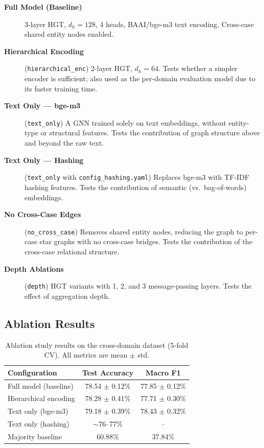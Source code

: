 \documentclass[12pt,a4paper]{report}
\begin{document}
\begin{description}
  \item[\textbf{Full Model (Baseline)}] 3-layer HGT, $d_h=128$, 4 heads, BAAI/bge-m3 text encoding. Cross-case shared entity nodes enabled.

  \item[\textbf{Hierarchical Encoding}] (\texttt{hierarchical\_enc}) 2-layer HGT, $d_h=64$. Tests whether a simpler encoder is sufficient; also used as the per-domain evaluation model due to its faster training time.

  \item[\textbf{Text Only --- bge-m3}] (\texttt{text\_only}) A GNN trained solely on text embeddings, without entity-type or structural features. Tests the contribution of graph structure above and beyond the raw text.

  \item[\textbf{Text Only --- Hashing}] (\texttt{text\_only} with \texttt{config\_hashing.yaml}) Replaces bge-m3 with TF-IDF hashing features. Tests the contribution of semantic (vs.\ bag-of-words) embeddings.

  \item[\textbf{No Cross-Case Edges}] (\texttt{no\_cross\_case}) Removes shared entity nodes, reducing the graph to per-case star graphs with no cross-case bridges. Tests the contribution of the cross-case relational structure.

  \item[\textbf{Depth Ablations}] (\texttt{depth}) HGT variants with 1, 2, and 3 message-passing layers. Tests the effect of aggregation depth.
\end{description}

\subsection{Ablation Results}

\begin{table}[H]
  \centering
  \caption{Ablation study results on the cross-domain dataset (5-fold CV). All metrics are mean $\pm$ std.}
  \label{tab:ablation_results}
  \begin{tabular}{lcc}
    \toprule
    \textbf{Configuration} & \textbf{Test Accuracy} & \textbf{Macro F1} \\
    \midrule
    Full model (baseline) & 78.54 $\pm$ 0.12\% & 77.85 $\pm$ 0.12\% \\
    Hierarchical encoding & 78.28 $\pm$ 0.41\% & 77.71 $\pm$ 0.30\% \\
    Text only (bge-m3) & 79.18 $\pm$ 0.39\% & 78.43 $\pm$ 0.32\% \\
    Text only (hashing) & $\sim$76--77\% & -- \\
    \midrule
    Majority baseline & 60.88\% & 37.84\% \\
    \bottomrule
  \end{tabular}
\end{table}
\end{document}
